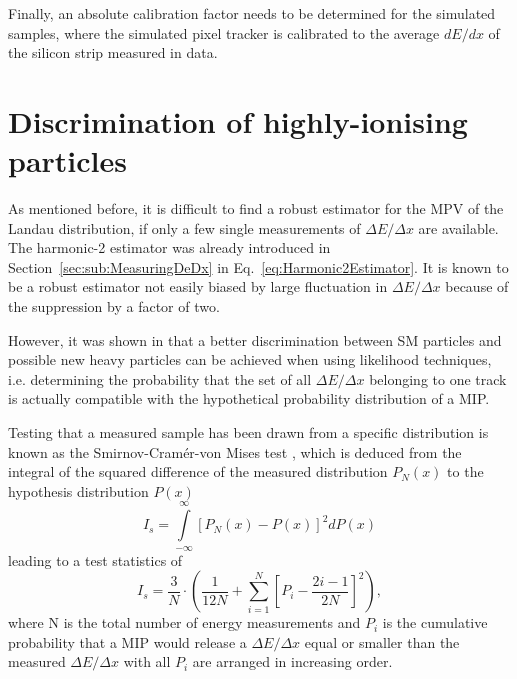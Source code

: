 Finally, an absolute calibration factor needs to be determined for the simulated samples, where the simulated pixel tracker is calibrated to the average $dE/dx$ of the silicon strip measured in data.

\section{Discrimination of highly-ionising particles}

As mentioned before, it is difficult to find a robust estimator for the MPV of the Landau distribution, if only a few single measurements of $\Delta E/ \Delta x$  are available.
The harmonic-2 estimator \ihtwo was already introduced in Section~\ref{sec:sub:MeasuringDeDx} in Eq.~\ref{eq:Harmonic2Estimator}.
It is known to be a robust estimator not easily biased by large fluctuation in $\Delta E/ \Delta x$ because of the suppression by a factor of two.

However, it was shown in \cite{bib:Quertenmont_2010} that a better discrimination between SM particles and possible new heavy particles can be achieved when using likelihood techniques,
i.e. determining the probability that the set of all $\Delta E/ \Delta x$ belonging to one track is actually compatible with the hypothetical probability distribution of a MIP.

Testing that a measured sample has been drawn from a specific distribution is known as the Smirnov-Cram\'{e}r-von Mises test \cite{bib:Anderson:CramerVonMises_1962,bib:James:StaticticalMethods_2006},
which is deduced from the integral of the squared difference of the measured distribution $P_N(x)$ to the hypothesis distribution $P(x)$
\begin{equation*}
I_s = \int\limits_{-\infty}^{\infty} \left[P_{N}(x)-P(x)\right]^2 dP(x)
\end{equation*}
leading to a test statistics of
\begin{equation*}
I_s = \frac{3}{N} \cdot \left( \frac{1}{12N} + \sum\limits_{i=1}^N \left[ P_i - \frac{2i-1}{2N} \right]^2 \right),
\end{equation*}
where N is the total number of energy measurements and $P_i$ is the cumulative probability that a MIP would release a $\Delta E/\Delta x$ equal or smaller than the measured $\Delta E/ \Delta x$ with all $P_i$ are arranged in increasing order.


